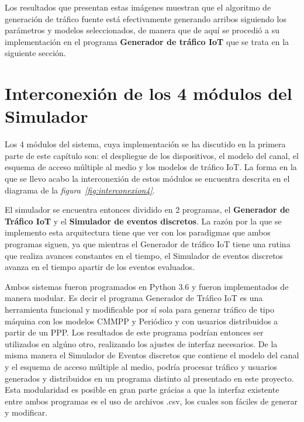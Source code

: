 Los resultados que presentan estas imágenes muestran que el algoritmo de generación de tráfico fuente está efectivamente generando arribos siguiendo los parámetros y modelos seleccionados, de manera que de aquí se procedió a su implementación en el programa \textbf{Generador de tráfico IoT} que se trata en la siguiente sección. \newline

\hfill

\break


\section{Interconexión de los 4 módulos del Simulador}

Los 4 módulos del sistema, cuya implementación se ha discutido en la primera parte de este capítulo son: el despliegue de los dispositivos, el modelo del canal, el esquema de acceso múltiple al medio y los modelos de tráfico IoT. La forma en la que se llevo acabo la interconexión de estos módulos se encuentra descrita en el diagrama de la \textit{figura~\ref{fig:interconexion4}}. \newline

El simulador se encuentra entonces dividido en 2 programas, el \textbf{Generador de Tráfico IoT} y el \textbf{Simulador de eventos discretos}. La razón por la que se implemento esta arquitectura tiene que ver con los paradigmas que ambos programas siguen, ya que mientras el Generador de tráfico IoT tiene una rutina que realiza avances constantes en el tiempo, el Simulador de eventos discretos avanza en el tiempo apartir de los eventos evaluados. \newline

Ambos sistemas fueron programados en Python 3.6 y fueron implementados de manera modular. Es decir el programa Generador de Tráfico IoT es una herramienta funcional y modificable por sí sola para generar tráfico de tipo máquina con los modelos CMMPP y Periódico y con usuarios distribuidos a partir de un PPP. Los resultados de este programa podrían entonces ser utilizados en algúno otro, realizando los ajustes de interfaz necesarios. De la misma manera el Simulador de Eventos discretos que contiene el modelo del canal y el esquema de acceso múltiple al medio, podría procesar tráfico y usuarios generados y distribuidos en un programa distinto al presentado en este proyecto. Esta modularidad es posible en gran parte grácias a que la interfaz existente entre ambos programas es el uso de archivos .csv, los cuales son fáciles de generar y modificar.\newline

